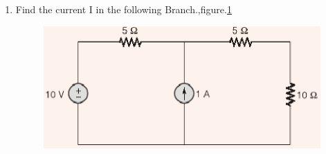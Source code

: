\documentclass[journal,12pt,twocolumn]{IEEEtran}
\begin{document}
\begin{enumerate}
\item Find the current I in the following Branch.,figure.\ref{fig92}
\begin{figure}[!h]
\begin{center}
\includegraphics[scale=0.5]{./figs/fig92.eps}
\caption{}
\label{fig92}
\end{center}
\end{figure}


\end{enumerate}
\end{document}
